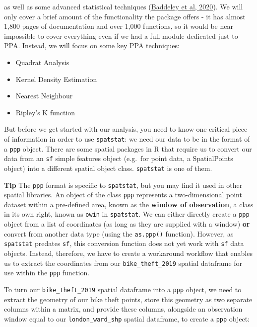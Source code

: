 \documentclass[
]{book}
\providecommand{\tightlist}{%
  \setlength{\itemsep}{0pt}\setlength{\parskip}{0pt}}
\begin{document}
as well as some advanced statistical techniques (\href{https://cran.r-project.org/web/packages/spatstat/vignettes/getstart.pdf}{Baddeley et al, 2020}). We will only cover a brief amount of the functionality the package offers - it has almost 1,800 pages of documentation and over 1,000 functions, so it would be near impossible to cover everything even if we had a full module dedicated just to PPA. Instead, we will focus on some key PPA techniques:

\begin{itemize}
\tightlist
\item
  Quadrat Analysis
\item
  Kernel Density Estimation
\item
  Nearest Neighbour
\item
  Ripley's K function
\end{itemize}

But before we get started with our analysis, you need to know one critical piece of information in order to use \texttt{spatstat}: we need our data to be in the format of a \texttt{ppp} object. There are some spatial packages in R that require us to convert our data from an \texttt{sf} simple features object (e.g.~for point data, a SpatialPoints object) into a different spatial object class. \texttt{spatstat} is one of them.

\textbf{Tip}
The \texttt{ppp} format is specific to \texttt{spatstat}, but you may find it used in other spatial libraries. An object of the class \texttt{ppp} represents a two-dimensional point dataset within a pre-defined area, known as the \textbf{window of observation}, a class in its own right, known as \texttt{owin} in \texttt{spatstat}. We can either directly create a \texttt{ppp} object from a list of coordinates (as long as they are supplied with a window) \textbf{or} convert from another data type (using the \texttt{as.ppp()} function). However, as \texttt{spatstat} predates \texttt{sf}, this conversion function does not yet work with \texttt{sf} data objects. Instead, therefore, we have to create a workaround workflow that enables us to extract the coordinates from our \texttt{bike\_theft\_2019} spatial dataframe for use within the \texttt{ppp} function.

To turn our \texttt{bike\_theft\_2019} spatial dataframe into a \texttt{ppp} object, we need to extract the geometry of our bike theft points, store this geometry as two separate columns within a matrix, and provide these columns, alongside an observation window equal to our \texttt{london\_ward\_shp} spatial dataframe, to create a \texttt{ppp} object:
\end{document}

